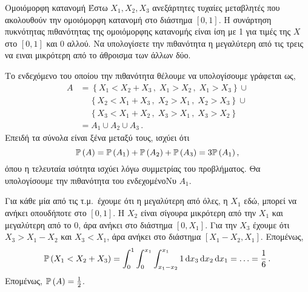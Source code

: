 \documentclass[10pt,greek,solution]{exam-uoc}
\begin{document}
\begin{question}[20]{Ομοιόμορφη κατανομή}
%
Έστω $X_1, X_2, X_3$ ανεξάρτητες τυχαίες μεταβλητές που ακολουθούν την ομοιόμορφη 
κατανομή στο διάστημα $[0, 1]$. Η συνάρτηση πυκνότητας πιθανότητας της ομοιόμορφης 
κατανομής είναι ίση με 1 για τιμές της $X$ στο $[0, 1]$ και 0 αλλού.
Να υπολογίσετε την πιθανότητα η μεγαλύτερη από τις τρεις να ειναι μικρότερη από το 
άθροισμα των άλλων δύο.


\begin{solution}
%
Το ενδεχόμενο του οποίου την πιθανότητα θέλουμε να υπολογίσουμε γράφεται ως,
%
\begin{equation}
\begin{split}
    A 
    &= \left\{ X_1 < X_2 + X_3\,,\; X_1 > X_2\,,\; X_1>X_3 \right\} \cup 
    \\
    & \quad\, \left\{ X_2 < X_1 + X_3\,,\; X_2 > X_1\,,\; X_2 > X_3 \right\} \cup 
    \\
    & \quad\, \left\{ X_3 < X_1 + X_2\,,\; X_3 > X_1\,,\; X_3 > X_2 \right\} \\
    &=
    A_1 \cup A_2 \cup A_3 \,.
\end{split}
\end{equation}
%
Επειδή τα σύνολα είναι ξένα μεταξύ τους, ισχύει ότι
%
\begin{equation}
    \Prob(A) = 
    \Prob(A_1) + \Prob(A_2) + \Prob(A_3) =
     3\Prob(A_1)\,,
\end{equation}
%
όπου η τελευταία ισότητα ισχύει λόγω συμμετρίας του προβλήματος.
Θα υπολογίσουμε την πιθανότητα του ενδεχομένοNυ $A_1$.

Για κάθε μία από τις τ.μ.\ έχουμε ότι η μεγαλύτερη από όλες, η $X_1$ εδώ, μπορεί να
ανήκει οπουδήποτε στο $[0,1]$.  
Η $X_2$ είναι σίγουρα μικρότερη από την $X_1$ και μεγαλύτερη από το 0, άρα ανήκει στο 
διάστημα $[0, X_1]$. 
Για την $X_3$ έχουμε ότι $X_3 > X_1 - X_2$ και $X_3<X_1$, άρα ανήκει στο διάστημα 
$[X_1 - X_2, X_1]$.
Επομένως, 
%
%
\begin{equation}
    \Prob(X_1 < X_2 + X_3)
    = \int_0^1 \int_0^{x_1} \int_{x_1 - x_2}^{x_1} 1 \dif x_3 \dif x_2 \dif x_1
    = \ldots = \frac{1}{6} \,.
\end{equation}
%
Επομένως, $\Prob(A) = \frac{1}{2}$.
%
\end{solution}

\end{question}


\newpage\thispagestyle{empty}
\end{document}
